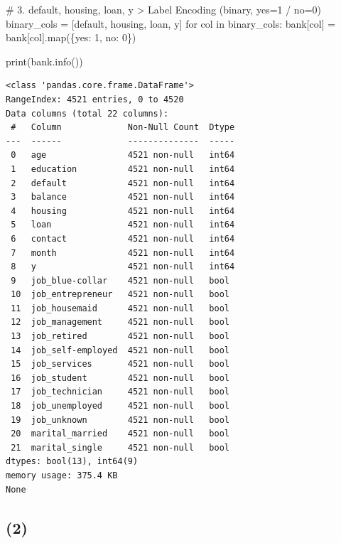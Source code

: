 \documentclass[
  a4paper,
  DIV=11,
  numbers=noendperiod]{scrreprt}
\newenvironment{Shaded}{\begin{snugshade}}{\end{snugshade}}
\newcommand{\BuiltInTok}[1]{\textcolor[rgb]{0.00,0.23,0.31}{#1}}
\newcommand{\CommentTok}[1]{\textcolor[rgb]{0.37,0.37,0.37}{#1}}
\newcommand{\ControlFlowTok}[1]{\textcolor[rgb]{0.00,0.23,0.31}{#1}}
\newcommand{\DecValTok}[1]{\textcolor[rgb]{0.68,0.00,0.00}{#1}}
\newcommand{\KeywordTok}[1]{\textcolor[rgb]{0.00,0.23,0.31}{#1}}
\newcommand{\NormalTok}[1]{\textcolor[rgb]{0.00,0.23,0.31}{#1}}
\newcommand{\OperatorTok}[1]{\textcolor[rgb]{0.37,0.37,0.37}{#1}}
\newcommand{\StringTok}[1]{\textcolor[rgb]{0.13,0.47,0.30}{#1}}
\begin{document}
\begin{Shaded}
\begin{Highlighting}[]
\CommentTok{\# 3. default, housing, loan, y \textgreater{} Label Encoding (binary, yes=1 / no=0)}
\NormalTok{binary\_cols }\OperatorTok{=}\NormalTok{ [}\StringTok{\textquotesingle{}default\textquotesingle{}}\NormalTok{, }\StringTok{\textquotesingle{}housing\textquotesingle{}}\NormalTok{, }\StringTok{\textquotesingle{}loan\textquotesingle{}}\NormalTok{, }\StringTok{\textquotesingle{}y\textquotesingle{}}\NormalTok{]}
\ControlFlowTok{for}\NormalTok{ col }\KeywordTok{in}\NormalTok{ binary\_cols: bank[col] }\OperatorTok{=}\NormalTok{ bank[col].}\BuiltInTok{map}\NormalTok{(\{}\StringTok{\textquotesingle{}yes\textquotesingle{}}\NormalTok{: }\DecValTok{1}\NormalTok{, }\StringTok{\textquotesingle{}no\textquotesingle{}}\NormalTok{: }\DecValTok{0}\NormalTok{\})}

\BuiltInTok{print}\NormalTok{(bank.info())}
\end{Highlighting}
\end{Shaded}

\begin{verbatim}
<class 'pandas.core.frame.DataFrame'>
RangeIndex: 4521 entries, 0 to 4520
Data columns (total 22 columns):
 #   Column             Non-Null Count  Dtype
---  ------             --------------  -----
 0   age                4521 non-null   int64
 1   education          4521 non-null   int64
 2   default            4521 non-null   int64
 3   balance            4521 non-null   int64
 4   housing            4521 non-null   int64
 5   loan               4521 non-null   int64
 6   contact            4521 non-null   int64
 7   month              4521 non-null   int64
 8   y                  4521 non-null   int64
 9   job_blue-collar    4521 non-null   bool 
 10  job_entrepreneur   4521 non-null   bool 
 11  job_housemaid      4521 non-null   bool 
 12  job_management     4521 non-null   bool 
 13  job_retired        4521 non-null   bool 
 14  job_self-employed  4521 non-null   bool 
 15  job_services       4521 non-null   bool 
 16  job_student        4521 non-null   bool 
 17  job_technician     4521 non-null   bool 
 18  job_unemployed     4521 non-null   bool 
 19  job_unknown        4521 non-null   bool 
 20  marital_married    4521 non-null   bool 
 21  marital_single     4521 non-null   bool 
dtypes: bool(13), int64(9)
memory usage: 375.4 KB
None
\end{verbatim}

\subsection{(2)}\label{section-1}
\end{document}

